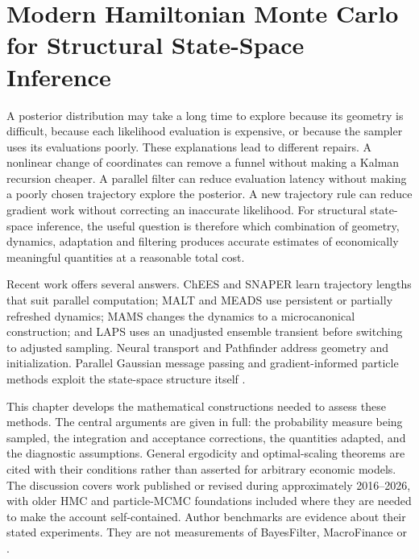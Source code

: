 \chapter[Modern HMC for State-Space Inference]{Modern Hamiltonian Monte Carlo for Structural State-Space Inference}
\label{ch:bf-modern-hmc}

A posterior distribution may take a long time to explore because its geometry
is difficult, because each likelihood evaluation is expensive, or because the
sampler uses its evaluations poorly. These explanations lead to different
repairs. A nonlinear change of coordinates can remove a funnel without making
a Kalman recursion cheaper. A parallel filter can reduce evaluation latency
without making a poorly chosen trajectory explore the posterior. A new
trajectory rule can reduce gradient work without correcting an inaccurate
likelihood. For structural state-space inference, the useful question is
therefore which combination of geometry, dynamics, adaptation and filtering
produces accurate estimates of economically meaningful quantities at a
reasonable total cost.

Recent work offers several answers. ChEES and SNAPER learn trajectory lengths
that suit parallel computation; MALT and MEADS use persistent or partially
refreshed dynamics; MAMS changes the dynamics to a microcanonical construction;
and LAPS uses an unadjusted ensemble transient before switching to adjusted
sampling. Neural transport and Pathfinder address geometry and initialization.
Parallel Gaussian message passing and gradient-informed particle methods
exploit the state-space structure itself
\citep{hoffman2021chees,sountsov2022snaper,rioudurand2023malt,
hoffman2022meads,robnik2025mams,robnik2026laps,hoffman2019neutra,
zhang2022pathfinder,sarkka2020parallel,corenflos2024particlemala}.

This chapter develops the mathematical constructions needed to assess these
methods. The central arguments are given in full: the probability measure
being sampled, the integration and acceptance corrections, the quantities
adapted, and the diagnostic assumptions. General ergodicity and optimal-scaling
theorems are cited with their conditions rather than asserted for arbitrary
economic models. The discussion covers work published or revised during
approximately 2016--2026, with older HMC and particle-MCMC foundations included
where they are needed to make the account self-contained. Author benchmarks
are evidence about their stated experiments. They are not measurements of
BayesFilter, MacroFinance or .

